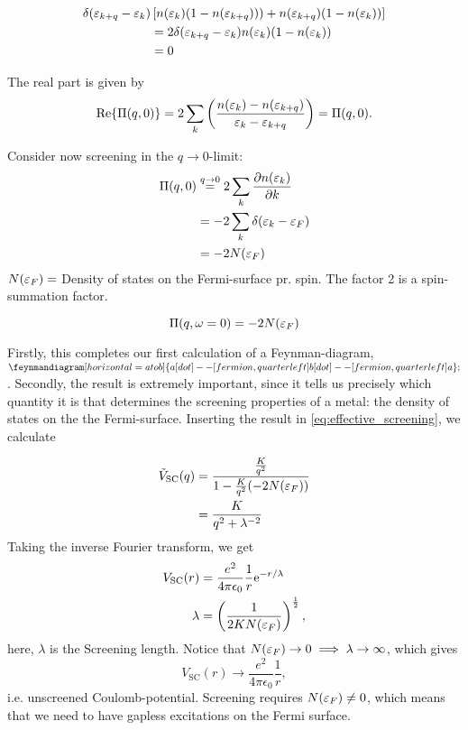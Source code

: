 \begin{align*}
	\delta(\varepsilon_{k+q}-\varepsilon_{k})&\left[n(\varepsilon_{k})(1-n(\varepsilon_{k+q}))) + n(\varepsilon_{k+q})(1-n(\varepsilon_{k}))\right] \\
	&= 2\delta(\varepsilon_{k+q} -\varepsilon_k)n(\varepsilon_k)(1-n(\varepsilon_{k})) \\
	&= 0
\end{align*}

The real part is given by 
\begin{equation*}
\Re{\Pi(q, 0)} = 2\sum_k\left(\frac{n(\varepsilon_k)-n(\varepsilon_{k+q})}{\varepsilon_k-\varepsilon_{k+q}}\right) = \Pi(q, 0).
\end{equation*}

Consider now screening in the \(q\rightarrow 0\)-limit:
\begin{align*}
	\Pi(q, 0) & \overset{q\rightarrow0}{=} 2\sum_k\pdv{n(\varepsilon_k)}{k} \\
	&= -2\sum_k\delta(\varepsilon_k-\varepsilon_{F}) \\
	&= -2N(\varepsilon_F)
\end{align*}
\(N(\varepsilon_F) = \) Density of states on the Fermi-surface pr. spin. 
The factor 2 is a spin-summation factor.
\begin{tcolorbox}
	\begin{equation}
		\Pi(q, \omega=0) = -2N(\varepsilon_F)
	\end{equation}
\end{tcolorbox}
Firstly, this completes our first calculation of a Feynman-diagram, $\begin{gathered}
\feynmandiagram[horizontal = a to b]{a[dot]--[fermion, quarter left] b[dot] --[fermion, quarter left] a};
\end{gathered}$.
Secondly, the result is extremely important, since it tells us precisely which quantity it is that determines the screening properties of a metal: the density of states on the the Fermi-surface.
Inserting the result in \cref{eq:effective_screening}, we calculate

\begin{align*}
	\tilde{V}_{\text{SC}}(q) &= \frac{\frac{K}{q^2}}{1-\frac{K}{q^2}(-2N(\varepsilon_F))} \\
	&= \frac{K}{q^2 + \lambda^{-2}}
\end{align*}
Taking the inverse Fourier transform, we get
\begin{align}
	V_{\text{SC}}(r) &= \frac{e^2}{4\pi\epsilon_0}\frac{1}{r}\mathrm{e}^{-r/\lambda} \\
	\lambda &= \left(\frac{1}{2KN(\varepsilon_F)}\right)^\frac{1}{2} ,
\end{align}
here, $\lambda$ is the Screening length.
Notice that \(N(\varepsilon_F) \rightarrow 0 \implies \lambda \rightarrow \infty\), which gives 
\begin{equation}
	V_{\text{SC}}(r) \rightarrow \frac{e^2}{4\pi\epsilon_0}\frac{1}{r}, 
\end{equation}
i.e. unscreened Coulomb-potential.
Screening requires $N(\varepsilon_F) \ne 0$, which means that we need to have gapless excitations on the Fermi surface. 

